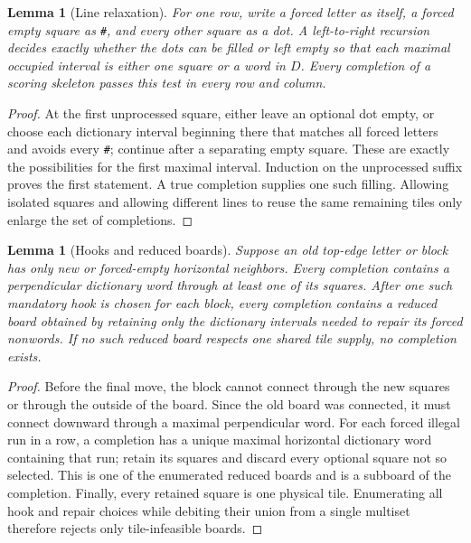 \documentclass{article}
\theoremstyle{plain}
\newtheorem{lemma}[theorem]{Lemma}
\newcommand{\word}[1]{\texttt{#1}}
\begin{document}
\begin{lemma}[Line relaxation]\label{lem:line}
For one row, write a forced letter as itself, a forced empty square as
\word{\#}, and every other square as a dot. A left-to-right recursion decides
exactly whether the dots can be filled or left empty so that each maximal
occupied interval is either one square or a word in $D$. Every completion of a
scoring skeleton passes this test in every row and column.
\end{lemma}
\begin{proof}
At the first unprocessed square, either leave an optional dot empty, or choose
each dictionary interval beginning there that matches all forced letters and
avoids every \word{\#}; continue after a separating empty square. These are
exactly the possibilities for the first maximal interval. Induction on the
unprocessed suffix proves the first statement. A true completion supplies one
such filling. Allowing isolated squares and allowing different lines to reuse
the same remaining tiles only enlarge the set of completions.
\end{proof}

\begin{lemma}[Hooks and reduced boards]\label{lem:hooks}
Suppose an old top-edge letter or block has only new or forced-empty horizontal
neighbors. Every completion contains a perpendicular dictionary word through
at least one of its squares. After one such \emph{mandatory hook} is chosen for
each block, every completion contains a reduced board obtained by retaining
only the dictionary intervals needed to repair its forced nonwords. If no such
reduced board respects one shared tile supply, no completion exists.
\end{lemma}
\begin{proof}
Before the final move, the block cannot connect through the new squares or
through the outside of the board. Since the old board was connected, it must
connect downward through a maximal perpendicular word. For each forced illegal
run in a row, a completion has a unique maximal horizontal dictionary word
containing that run; retain its squares and discard every optional square not
so selected. This is one of the enumerated reduced boards and is a subboard of
the completion. Finally, every retained square is one physical tile. Enumerating
all hook and repair choices while debiting their union from a single multiset
therefore rejects only tile-infeasible boards.
\end{proof}
\end{document}
